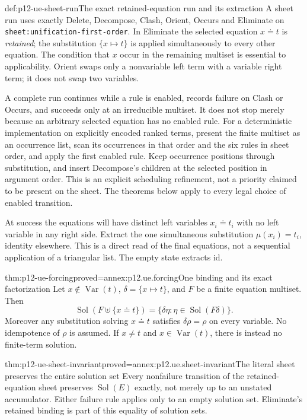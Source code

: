 \begin{hbdefinition}{def:p12-ue-sheet-run}{The exact retained-equation run and its extraction}
A sheet run uses exactly Delete, Decompose, Clash, Orient, Occurs and
Eliminate on \texttt{sheet:unification-first-order}. In Eliminate the
selected equation \(x\doteq t\) is \emph{retained}; the substitution
\(\{x\mapsto t\}\) is applied simultaneously to every other equation.
The condition that \(x\) occur in the remaining multiset is essential
to applicability. Orient swaps only a nonvariable left term with a
variable right term; it does not swap two variables.

A complete run continues while a rule is enabled, records failure on
Clash or Occurs, and succeeds only at an irreducible multiset. It does
not stop merely because an arbitrary selected equation has no enabled
rule. For a deterministic implementation on explicitly encoded ranked
terms, present the finite multiset
as an occurrence list, scan its occurrences in that order and the six
rules in sheet order, and apply the first enabled rule. Keep occurrence
positions through substitution, and insert Decompose's children at the
selected position in argument order. This is an explicit scheduling
refinement, not a priority claimed to be present on the sheet. The
theorems below apply to every legal choice of enabled transition.

At success the equations will have distinct left variables
\(x_i\doteq t_i\) with no left variable in any right side. Extract the
one simultaneous substitution \(\mu(x_i)=t_i\), identity elsewhere.
This is a direct read of the final equations, not a sequential application
of a triangular list. The empty state extracts \(\mathrm{id}\).
\end{hbdefinition}

\begin{hblemma}{thm:p12-ue-forcing}{proved=annex:p12.ue.forcing}{One binding and its exact factorization}
Let \(x\notin\operatorname{Var}(t)\),
\(\delta=\{x\mapsto t\}\), and \(F\) be a finite equation multiset.
Then
\[
 \operatorname{Sol}(F\uplus\{x\doteq t\})
  =\{\delta\eta:\eta\in\operatorname{Sol}(F\delta)\}.
\]
Moreover any substitution solving \(x\doteq t\) satisfies
\(\delta\rho=\rho\) on every variable. No idempotence of \(\rho\)
is assumed. If \(x\ne t\) and \(x\in\operatorname{Var}(t)\),
there is instead no finite-term solution.
\end{hblemma}

\begin{hbtheorem}{thm:p12-ue-sheet-invariant}{proved=annex:p12.ue.sheet-invariant}{The literal sheet preserves the entire solution set}
Every nonfailure transition of the retained-equation sheet preserves
\(\operatorname{Sol}(E)\) exactly, not merely up to an unstated
accumulator. Either failure rule applies only to an empty solution set.
Eliminate's retained binding is part of this equality of solution sets.
\end{hbtheorem}

